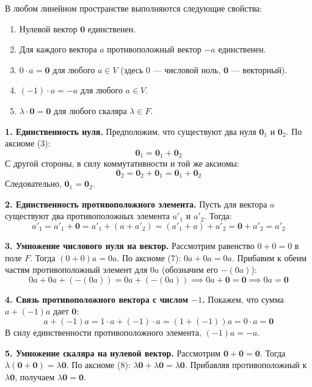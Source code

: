 \begin{theorem}
В любом линейном пространстве выполняются следующие свойства:
\begin{enumerate}
    \item Нулевой вектор $\mathbf{0}$ единственен.
    \item Для каждого вектора $a$ противоположный вектор $-a$ единственен.
    \item $0 \cdot a = \mathbf{0}$ для любого $a \in V$ (здесь $0$ — числовой ноль, $\mathbf{0}$ — векторный).
    \item $(-1) \cdot a = -a$ для любого $a \in V$.
    \item $\lambda \cdot \mathbf{0} = \mathbf{0}$ для любого скаляра $\lambda \in F$.
\end{enumerate}
\end{theorem}

\begin{tcolorbox}[title=Доказательство, breakable]
\textbf{1. Единственность нуля.}
Предположим, что существуют два нуля $\mathbf{0}_1$ и $\mathbf{0}_2$. По аксиоме (3):
\[ \mathbf{0}_1 = \mathbf{0}_1 + \mathbf{0}_2 \]
С другой стороны, в силу коммутативности и той же аксиомы:
\[ \mathbf{0}_2 = \mathbf{0}_2 + \mathbf{0}_1 = \mathbf{0}_1 + \mathbf{0}_2 \]
Следовательно, $\mathbf{0}_1 = \mathbf{0}_2$.

\textbf{2. Единственность противоположного элемента.}
Пусть для вектора $a$ существуют два противоположных элемента $a'_1$ и $a'_2$. Тогда:
\[ a'_1 = a'_1 + \mathbf{0} = a'_1 + (a + a'_2) = (a'_1 + a) + a'_2 = \mathbf{0} + a'_2 = a'_2 \]

\textbf{3. Умножение числового нуля на вектор.}
Рассмотрим равенство $0 + 0 = 0$ в поле $F$. Тогда $(0 + 0)a = 0a$. По аксиоме (7): $0a + 0a = 0a$. Прибавим к обеим частям противоположный элемент для $0a$ (обозначим его $-(0a)$):
\[ 0a + 0a + (-(0a)) = 0a + (-(0a)) \implies 0a + \mathbf{0} = \mathbf{0} \implies 0a = \mathbf{0} \]

\textbf{4. Связь противоположного вектора с числом $-1$.}
Покажем, что сумма $a + (-1)a$ дает $\mathbf{0}$:
\[ a + (-1)a = 1 \cdot a + (-1) \cdot a = (1 + (-1))a = 0 \cdot a = \mathbf{0} \]
В силу единственности противоположного элемента, $(-1)a = -a$.

\textbf{5. Умножение скаляра на нулевой вектор.}
Рассмотрим $\mathbf{0} + \mathbf{0} = \mathbf{0}$. Тогда $\lambda(\mathbf{0} + \mathbf{0}) = \lambda\mathbf{0}$. По аксиоме (8): $\lambda\mathbf{0} + \lambda\mathbf{0} = \lambda\mathbf{0}$. Прибавляя противоположный к $\lambda\mathbf{0}$, получаем $\lambda\mathbf{0} = \mathbf{0}$.
\end{tcolorbox}

